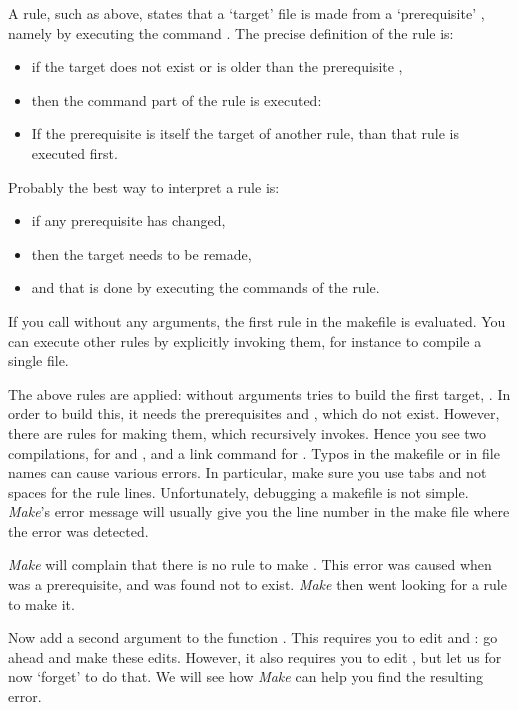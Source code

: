 A rule, such as above, states that a `target' file  is made
from a `prerequisite' , namely by executing the command . The precise definition of the rule is:
\begin{itemize}
\item if the target  does not exist or is older than the
  prerequisite ,
\item then the command part of the rule is executed: 
\item If the prerequisite is itself the target of another rule, than that
  rule is executed first.
\end{itemize}
Probably the best way to interpret a rule is:
\begin{itemize}
\item if any prerequisite has changed,
\item then the target needs to be remade,
\item and that is done by executing the commands of the rule.
\end{itemize}

If you call  without any arguments,
the first rule in the makefile is evaluated. You can execute other
rules by explicitly invoking them, for instance  to
compile a single file.

  {The above rules are applied:  without arguments tries to
    build the first target, . In order to build this, it
    needs the prerequisites  and , which do not
    exist. However, there are rules for making them, which 
    recursively invokes. Hence you see two compilations, for 
    and , and a link command for .}
  {Typos in the makefile or in file names can cause various
    errors. In particular, make sure you use tabs and not spaces for
    the rule lines. Unfortunately, debugging a makefile is not simple. 
    \emph{Make}'s error message will usually give 
    you the line number in the make file where the error was detected.}

  {\emph{Make} will complain that there is no rule to make
    . This error was caused when  was a
    prerequisite, and was found not to exist. \emph{Make} then went
    looking for a rule to make it.}{}

Now add a second argument to the function . This requires you
to edit  and : go ahead and make these
edits. However, it also requires you to edit , but let us for
now `forget' to do that. We will see how \emph{Make} can help you find
the resulting error.

